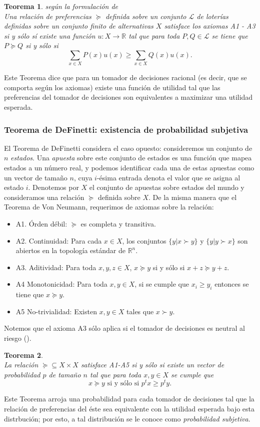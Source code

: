 \documentclass[11pt]{article}
\theoremstyle{plain}
\newtheorem{teo}{Teorema}
\begin{document}
\begin{teo}{según la formulación de \cite{jensen1967introduction}}\\
Una relación de preferencias $\succeq$ definida sobre un conjunto $\mathcal{L}$ de loterías definidas sobre un conjunto finito de alternativas $X$ satisface los axiomas A1 - A3 si y sólo sí existe una función $u: X \to \mathbb{R}$ tal que para toda $P,Q \in \mathcal{L}$ se tiene que $P \succeq Q$ si y sólo si 
\[ \sum_{x \in X} P(x) u(x) \geq \sum_{x \in X} Q(x) u(x).  \]
\end{teo}
\indent Este Teorema dice que para un tomador de decisiones racional (es decir, que se comporta según los axiomas) existe una función de utilidad tal que las preferencias del tomador de decisiones son equivalentes a maximizar una utilidad esperada.
\subsubsection{Teorema de DeFinetti: existencia de probabilidad subjetiva}
El Teorema de DeFinetti considera el caso opuesto: consideremos un conjunto de  $n$ \textit{estados}. Una \textit{apuesta} sobre este conjunto de estados es una función que mapea estados a un número real, y podemos identificar cada una de estas apuestas como un vector de tamaño $n$, cuya $i$-ésima entrada denota el valor que se asigna al estado $i$. Denotemos por $X$ el conjunto de apuestas sobre estados del mundo y consideramos una relación $\succeq$ definida sobre $X$. De la misma manera que el Teorema de Von Neumann, requerimos de axiomas sobre la relación:
\begin{itemize}
\item A1. Órden débil: $\succeq$ es completa y transitiva.
\item A2. Continuidad: Para cada $x \in X$, los conjuntos $\{ y | x \succ y \}$ y $\{ y | y \succ x \}$ son abiertos en la topología estándar de $\mathbb{R}^n$.
\item A3. Aditividad: Para toda $x,y,z \in X$, $x \succeq y$ si y sólo si $x+z \succeq y+z$.
\item A4 Monotonicidad: Para toda $x,y \in X$, si se cumple que $x_i \geq y_i$ entonces se tiene que $x \succeq y$.
\item A5 No-trivialidad: Existen $x,y \in X$ tales que $x \succ y$.
\end{itemize}
Notemos que el axioma A3 sólo aplica si el tomador de decisiones es neutral al riesgo (\cite{gilboa2009decision}).
\begin{teo}{\cite{definetti1937}}\\
La relación $\succeq \subseteq X \times X$ satisface A1-A5 si y sólo si existe un vector de probabilidad $p$ de tamaño $n$ tal que para toda $x,y \in X$ se cumple que
\[ x \succeq y \textrm { si y sólo si } p^t x \geq p^t y. \]
\end{teo}
\indent Este Teorema arroja una probabilidad para cada tomador de decisiones tal que la relación de preferencias del éste sea equivalente con la utilidad esperada bajo esta distrbución; por esto, a tal distribución se le conoce como \textit{probabilidad subjetiva}.
\end{document}
